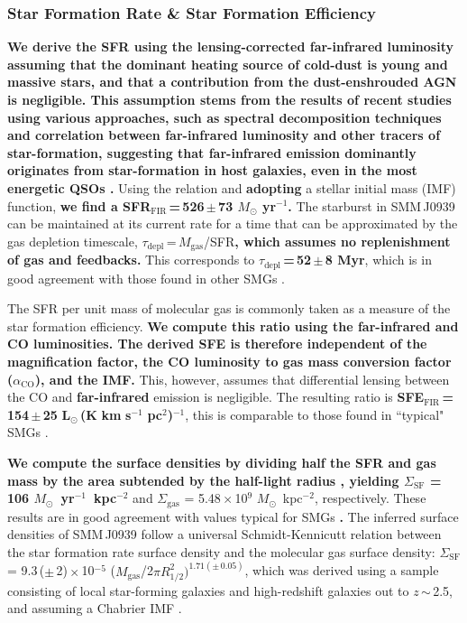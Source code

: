 \documentclass[iop, revtex4]{emulateapj}
\newcommand{\Msun}{\mbox{$M_{\odot}$}}
\newcommand{\Lsun}{\mbox{L$_{\odot}$}}
\newcommand{\LpU}{\mbox{K\,\,km\,\,s$^{-1}$\,\,pc$^2$}}
\newcommand{\eg}{{\sl e.g.,~}}
\newcommand{\pmOne}{\mbox{$^{-1}$}}
\begin{document}
\subsubsection{{\bf Star Formation Rate \& Star Formation Efficiency}}
{\bf 
We derive the SFR using the lensing-corrected far-infrared luminosity
assuming 
that the dominant heating source of cold-dust is young and massive stars, and 
that a contribution from the
dust-enshrouded AGN is negligible.
This assumption stems from the results of recent studies using various approaches, such as spectral decomposition techniques and correlation between far-infrared luminosity and other tracers of star-formation, suggesting that far-infrared emission dominantly originates from star-formation in host galaxies, even in the most energetic QSOs \citep[\eg][]{Netzer07a, Mullaney11a, Harrison15a}.
} 
Using the \citet{Kennicutt98a} relation and {\bf adopting} a \citet{Chabrier03a}
stellar initial mass (IMF) function, {\bf we find a
SFR$_\textrm{FIR}$\,=\,526\,$\pm$\,73 $M_
\odot$ yr\pmOne.}
The starburst in SMM\,J0939 can be maintained at its
current rate for a time that can be approximated by the gas depletion timescale, $\tau_\textrm{depl}$\,=\,$M_\textrm{gas}$/SFR{\bf , which assumes no replenishment of gas and feedbacks.}
This corresponds to {\bf $\tau_\textrm{depl}$\,=\,52\,$\pm$\,8 Myr}, which is in good agreement with those found in other SMGs \citep[\eg][]{Greve05a}.

The SFR per unit mass of molecular gas is commonly taken as a
measure of the star formation efficiency. 
{\bf We compute this ratio using the far-infrared
and CO luminosities. The derived SFE is therefore independent of the magnification factor, the CO luminosity to gas mass conversion factor ($\alpha_\textrm{CO}$), and the
IMF. }This, however, assumes that differential lensing between the CO and  {\bf far-infrared} emission is negligible.
The resulting ratio is {\bf SFE$_\textrm{FIR}$\,=\,154\,$\pm$\,25\,\,\Lsun\,(\LpU)$^{-1}$}, this is comparable
to those found in ``typical" SMGs \citep{Greve05a,Tacconi06a,Riechers11c}.

{\bf We compute the surface densities by dividing half the SFR and gas mass by the area subtended by the half-light
radius \citep[\eg][]{Genzel10a, Harrison15a}, yielding 
$\Sigma_\textrm{SF}$ = 106  \Msun~yr\pmOne~kpc$^{-2}$} and $\Sigma_\textrm{gas}$ = 5.48\,$\times$\,10$^9$ \Msun~kpc$^{-2}$, respectively. 
These results are in good agreement with values typical for SMGs {\bf \citep{Tacconi06a, Hodge15a}. }  %
The inferred surface densities of SMM\,J0939 follow a universal Schmidt-Kennicutt relation between the star formation rate
surface density and the molecular gas surface density: $\Sigma_\textrm{SF}$ = 9.3\,($\pm$\,2)\,$\times$\,10$^{-5}$ ($M_\textrm{gas}$/2$\pi R_\textrm{1/2}^2)^{1.71(\pm\,0.05)}$, which was derived using a sample consisting of local star-forming galaxies and high-redshift
galaxies
out to $z$\,$\sim$\,2.5, and assuming a Chabrier IMF \citep{B07a}.
\end{document}
